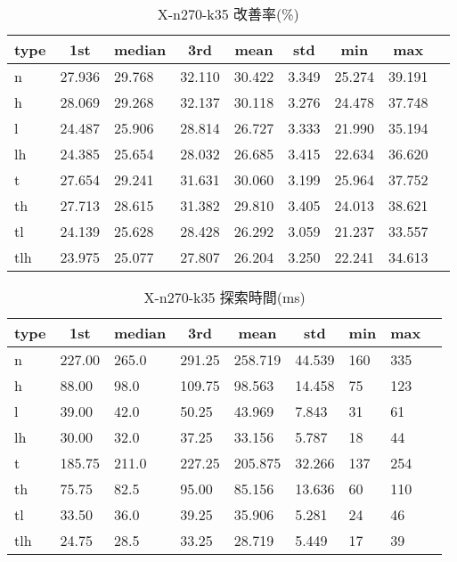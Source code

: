 \begin{table}[htbp]
    \centering
    \caption{X-n270-k35 改善率(\%)}
    \begin{tabular}{|l|l|l|l|l|l|l|l|l|}\hline
    \multicolumn{1}{|c|}{\textbf{type}}
    &\multicolumn{1}{|c|}{\textbf{1st}}
    &\multicolumn{1}{c|}{\textbf{median}}
    &\multicolumn{1}{c|}{\textbf{3rd}}
    &\multicolumn{1}{c|}{\textbf{mean}}
    &\multicolumn{1}{c|}{\textbf{std}}
    &\multicolumn{1}{c|}{\textbf{min}}
    &\multicolumn{1}{c|}{\textbf{max}}\\\hline
	n & 27.936 & 29.768 & 32.110 & 30.422 & 3.349 & 25.274 & 39.191\\\hline
	h & 28.069 & 29.268 & 32.137 & 30.118 & 3.276 & 24.478 & 37.748\\\hline
	l & 24.487 & 25.906 & 28.814 & 26.727 & 3.333 & 21.990 & 35.194\\\hline
	lh & 24.385 & 25.654 & 28.032 & 26.685 & 3.415 & 22.634 & 36.620\\\hline
	t & 27.654 & 29.241 & 31.631 & 30.060 & 3.199 & 25.964 & 37.752\\\hline
	th & 27.713 & 28.615 & 31.382 & 29.810 & 3.405 & 24.013 & 38.621\\\hline
	tl & 24.139 & 25.628 & 28.428 & 26.292 & 3.059 & 21.237 & 33.557\\\hline
	tlh & 23.975 & 25.077 & 27.807 & 26.204 & 3.250 & 22.241 & 34.613\\\hline
	\end{tabular}
\end{table}
\begin{table}[htbp]
    \centering
    \caption{X-n270-k35 探索時間(ms)}
    \begin{tabular}{|l|l|l|l|l|l|l|l|l|}\hline
    \multicolumn{1}{|c|}{\textbf{type}}
    &\multicolumn{1}{|c|}{\textbf{1st}}
    &\multicolumn{1}{c|}{\textbf{median}}
    &\multicolumn{1}{c|}{\textbf{3rd}}
    &\multicolumn{1}{c|}{\textbf{mean}}
    &\multicolumn{1}{c|}{\textbf{std}}
    &\multicolumn{1}{c|}{\textbf{min}}
    &\multicolumn{1}{c|}{\textbf{max}}\\\hline
	n & 227.00 & 265.0 & 291.25 & 258.719 & 44.539 & 160 & 335\\\hline
	h & 88.00 & 98.0 & 109.75 & 98.563 & 14.458 & 75 & 123\\\hline
	l & 39.00 & 42.0 & 50.25 & 43.969 & 7.843 & 31 & 61\\\hline
	lh & 30.00 & 32.0 & 37.25 & 33.156 & 5.787 & 18 & 44\\\hline
	t & 185.75 & 211.0 & 227.25 & 205.875 & 32.266 & 137 & 254\\\hline
	th & 75.75 & 82.5 & 95.00 & 85.156 & 13.636 & 60 & 110\\\hline
	tl & 33.50 & 36.0 & 39.25 & 35.906 & 5.281 & 24 & 46\\\hline
	tlh & 24.75 & 28.5 & 33.25 & 28.719 & 5.449 & 17 & 39\\\hline
	\end{tabular}
\end{table}

